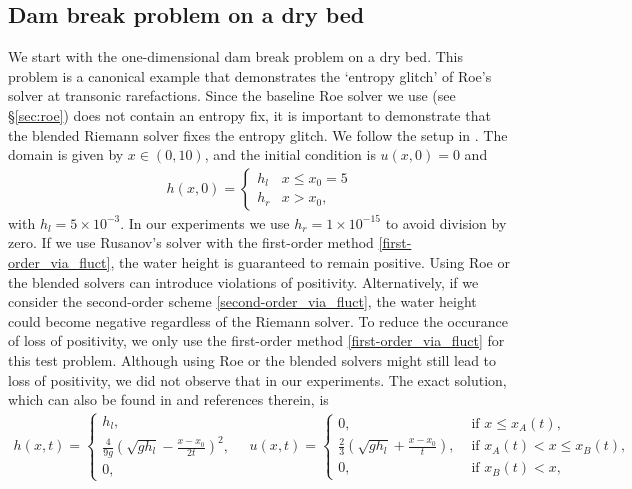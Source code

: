 \documentclass[preprint, 11pt]{article}
\begin{document}
\subsection{Dam break problem on a dry bed}\label{sec:rp_dry_bed}
We start with the one-dimensional dam break problem on a dry bed.
This problem is a canonical example that demonstrates the `entropy glitch' of Roe's solver
at transonic rarefactions. Since the baseline Roe solver we use (see \S\ref{sec:roe}) does not contain
an entropy fix, it is important to demonstrate that the blended Riemann solver fixes the entropy glitch.
We follow the setup in \cite[\S 4.1.2]{delestre2013swashes}.
The domain is given by $x\in(0,10)$, and the initial condition is $u(x,0)=0$ and
\begin{align*}
  h(x,0)=
  \begin{cases}
    h_l & x\leq x_0=5 \\
    h_r & x >x_0,
  \end{cases}
\end{align*}
with $h_l=5\times 10^{-3}$.  In our experiments we use $h_r=1\times
10^{-15}$ to avoid division by zero.
If we use Rusanov's solver with the first-order method \eqref{first-order_via_fluct}, 
the water height is guaranteed to remain positive. Using Roe or the blended solvers 
can introduce violations of positivity. Alternatively, if we consider the second-order scheme 
\eqref{second-order_via_fluct}, the water height could become negative regardless of the Riemann solver.
To reduce the occurance of loss of positivity, we only use the first-order method 
\eqref{first-order_via_fluct} for this test problem. 
Although using Roe or the blended solvers might still lead to loss of positivity, we 
did not observe that in our experiments.
The exact solution, which can also be found in \cite{delestre2013swashes} and references therein, is
\begin{align*}
  h(x,t) =
  \begin{cases}
    h_l, \\
    \frac{4}{9g}\left(\sqrt{gh_l}-\frac{x-x_0}{2t}\right)^2, \\
    0,
  \end{cases}
\quad
  u(x,t) =
  \begin{cases}
    0, &\mbox{ if } x\leq x_A(t), \\
    \frac{2}{3}\left(\sqrt{gh_l}+\frac{x-x_0}{t}\right), & \mbox{ if } x_A(t) < x\leq x_B(t), \\
    0, &\mbox{ if } x_B(t) < x,
  \end{cases}
\end{align*}
\end{document}
